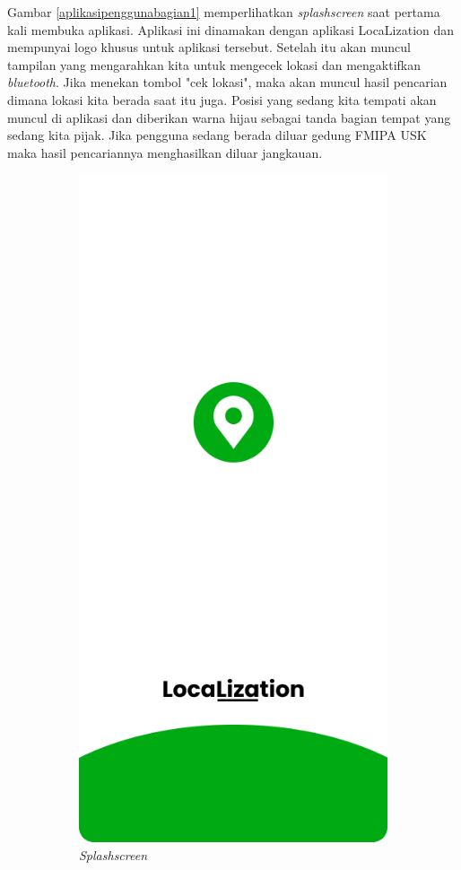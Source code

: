 \begin{enumerate}[a.]
\par Gambar \ref{aplikasipenggunabagian1} memperlihatkan \textit{splashscreen} saat pertama kali membuka aplikasi. Aplikasi ini dinamakan dengan aplikasi LocaLization dan mempunyai logo khusus untuk aplikasi tersebut. Setelah itu akan muncul tampilan yang mengarahkan kita untuk mengecek lokasi dan mengaktifkan \textit{bluetooth}. Jika menekan tombol "cek lokasi", maka akan muncul hasil pencarian dimana lokasi kita berada saat itu juga. Posisi yang sedang kita tempati akan muncul di aplikasi dan diberikan warna hijau sebagai tanda bagian tempat yang sedang kita pijak. Jika pengguna sedang berada diluar gedung FMIPA USK maka hasil pencariannya menghasilkan diluar jangkauan.
\vspace{-0cm}
\begin{figure} [H]
	\begin{subfigure}{.5\textwidth}
		\centering
		\includegraphics[width=.5\linewidth]{gambar/splashscreen}
		\caption{\textit{Splashscreen}}
	\end{subfigure}
	\begin{subfigure}{.5\textwidth}
		\centering

\end{subfigure}
\end{figure}
\end{enumerate}
